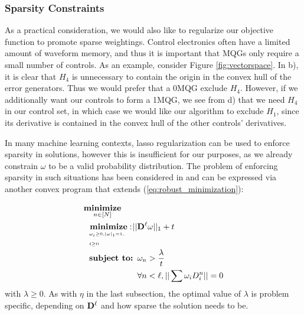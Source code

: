 \documentclass[aps,nofootinbib,pra,notitlepage,twocolumn]{revtex4-1}
\begin{document}

\subsubsection{Sparsity Constraints}

As a practical consideration, we would also like to regularize our objective function to promote sparse weightings. Control electronics often have a limited amount of waveform memory, and thus it is important that MQGs only require a small number of controls. As an example, consider Figure \ref{fig:vectorspace}. In b), it is clear that $H_4$ is unnecessary to contain the origin in the convex hull of the error generators. Thus we would prefer that a $0$MQG exclude $H_4$. However, if we additionally want our controls to form a 1MQG, we see from d) that we need $H_4$ in our control set, in which case we would like our algorithm to exclude $H_1$, since its derivative is contained in the convex hull of the other controls' derivatives. 

In many machine learning contexts, lasso regularization \cite{tibshirani1996regression} can be used to enforce sparsity in solutions, however this is insufficient for our purposes, as we already constrain $\omega$ to be a valid probability distribution. The problem of enforcing sparsity in such situations has been considered in \cite{NIPS2012_4504} and can be expressed via another convex program that extends (\ref{eq:robust_minimization}):

\begin{equation}\label{eq:minimization_regularization}
\begin{split}
&\underset{n\in[N]}{\textbf{minimize}}\\
&\ \ \bunderbrace{\textbf{minimize}: }{\omega_i\geq0, |\omega|_1=1,\\ t\geq0} ||{\bold{D}^{\ell}}\omega||_1 + t\\
&\ \ \textbf{subject to: } \omega_n > \frac{\lambda}{t}\\
&\ \ \phantom{\textbf{subject to: }} \forall n<\ell, ||\sum \omega_iD_i^n||=0
\end{split}
\end{equation} with $\lambda\geq0$. As with $\eta$ in the last subsection, the optimal value of $\lambda$ is problem specific, depending on $\bold{D}^\ell$ and how sparse the solution needs to be. 
\end{document}
